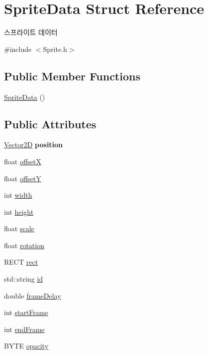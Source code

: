 \hypertarget{struct_sprite_data}{}\section{Sprite\+Data Struct Reference}
\label{struct_sprite_data}


스프라이트 데이터  




{\ttfamily \#include $<$Sprite.\+h$>$}

\subsection*{Public Member Functions}
\begin{DoxyCompactItemize}
\item 
\mbox{\hyperlink{struct_sprite_data_a180d297cf3681064f9fbc5e63418c981}{Sprite\+Data}} ()
\end{DoxyCompactItemize}
\subsection*{Public Attributes}
\begin{DoxyCompactItemize}
\item 
\mbox{\label{struct_sprite_data_ac973b3172d4b5e5b24a789f3c7e7a8e3}} 
\mbox{\hyperlink{class_vector2_d}{Vector2D}} {\bfseries position}
\item 
float \mbox{\hyperlink{struct_sprite_data_a0cb0febdf9c05fe3d4ec95d16d2b3dd4}{offsetX}}
\item 
float \mbox{\hyperlink{struct_sprite_data_a441bf3ef83a7fa3dc46fe43799d70560}{offsetY}}
\item 
int \mbox{\hyperlink{struct_sprite_data_a899b89f399a7e60b5e45e318736c39be}{width}}
\item 
int \mbox{\hyperlink{struct_sprite_data_ad06f31263babf80f91065c9daa0a299b}{height}}
\item 
float \mbox{\hyperlink{struct_sprite_data_a4122649415fc55f92bf9c873e965c479}{scale}}
\item 
float \mbox{\hyperlink{struct_sprite_data_a5c3cfa30dfc1cef21c37ba693767cb3e}{rotation}}
\item 
R\+E\+CT \mbox{\hyperlink{struct_sprite_data_a10c7b95e483dc4a1fe592dd171c0bee5}{rect}}
\item 
std\+::string \mbox{\hyperlink{struct_sprite_data_a694a056d642dcb382e0ecce96724bebd}{id}}
\item 
double \mbox{\hyperlink{struct_sprite_data_a5f27bbd8c8df280f5c28835c62040955}{frame\+Delay}}
\item 
int \mbox{\hyperlink{struct_sprite_data_a398dc40ccfdba9c995b6bda139b86079}{start\+Frame}}
\item 
int \mbox{\hyperlink{struct_sprite_data_a6a45148df15c2ae1f31bdff2f1c9ae9b}{end\+Frame}}
\item 
B\+Y\+TE \mbox{\hyperlink{struct_sprite_data_a91940ea27de1d748a30b06547dda2531}{opacity}}
\end{DoxyCompactItemize}


